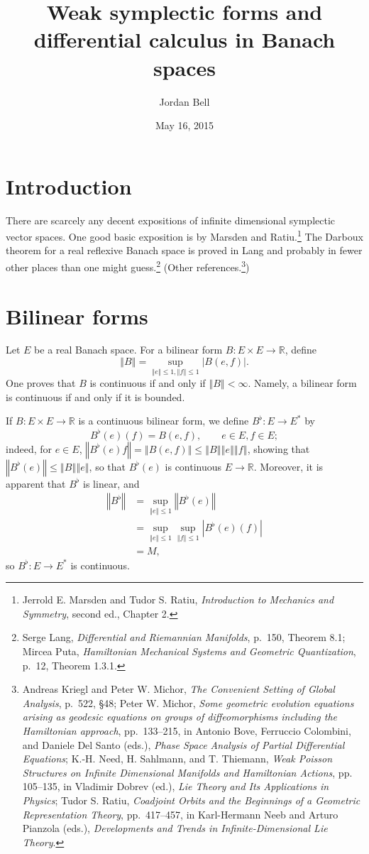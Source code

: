 \documentclass{article}
\newcommand{\norm}[1]{\left\Vert #1 \right\Vert}
\theoremstyle{definition}
\theoremstyle{definition}
\begin{document}
\title{Weak symplectic forms and differential calculus in Banach spaces}
\author{Jordan Bell}
\date{May 16, 2015}

\maketitle

\section{Introduction}
There are scarcely any decent expositions of infinite dimensional symplectic vector spaces. One good basic exposition
is by Marsden and Ratiu.\footnote{Jerrold E. Marsden and Tudor S. Ratiu, {\em Introduction to Mechanics and Symmetry}, second ed.,
Chapter 2.} The Darboux theorem for a real reflexive Banach space is proved in Lang and probably in fewer other places than one might
guess.\footnote{Serge Lang,
{\em Differential and Riemannian Manifolds}, p.~150, Theorem 8.1;
Mircea Puta, {\em Hamiltonian Mechanical Systems and Geometric Quantization}, p.~12, Theorem 1.3.1.}
(Other references.\footnote{Andreas Kriegl and Peter W. Michor, {\em The Convenient Setting of Global Analysis}, p.~522, \S 48;
Peter W. Michor,
{\em Some geometric evolution equations arising as geodesic equations on groups of diffeomorphisms including the Hamiltonian approach},
pp.~133--215, in
Antonio Bove, Ferruccio Colombini, and Daniele Del Santo (eds.), {\em Phase Space Analysis of Partial Differential Equations};
K.-H. Need, H. Sahlmann, and T. Thiemann, {\em Weak Poisson Structures on Infinite Dimensional Manifolds
and Hamiltonian Actions}, pp. 105--135, in Vladimir Dobrev (ed.), {\em Lie Theory and Its Applications in Physics};
Tudor S. Ratiu, {\em Coadjoint Orbits and the Beginnings of a Geometric Representation Theory}, pp.~417--457, in 
Karl-Hermann Neeb and Arturo Pianzola (eds.), {\em Developments and Trends in Infinite-Dimensional Lie Theory}.})


\section{Bilinear forms}
Let $E$ be a real Banach space. For a bilinear form $B:E \times E \to \mathbb{R}$, define
\[
\norm{B} = \sup_{\norm{e} \leq 1, \norm{f} \leq 1} |B(e,f)|.
\]
One proves that $B$ is continuous if and only if $\norm{B}<\infty$. Namely, a bilinear form is continuous if and only if it is bounded.

If $B:E \times E \to \mathbb{R}$ is a continuous bilinear form,
we define 
$B^\flat:E \to E^*$ by
\[
B^\flat(e)(f) = B(e,f), \qquad e \in E, f \in E;
\]
indeed, for $e \in E$, $\norm{B^\flat(e)f} = \norm{B(e,f)} \leq \norm{B} \norm{e} \norm{f}$, showing that
$\norm{B^\flat(e)} \leq \norm{B} \norm{e}$, so that
$B^\flat(e)$ is continuous $E \to \mathbb{R}$. Moreover, it is apparent that $B^\flat$ is linear, and
\begin{align*}
\norm{B^\flat}&=\sup_{\norm{e} \leq 1} \norm{B^\flat(e)}\\
&=\sup_{\norm{e} \leq 1} \sup_{\norm{f} \leq 1} |B^\flat(e)(f)|\\
&=M,
\end{align*}
so $B^\flat:E \to E^*$ is continuous. 
\end{document}
